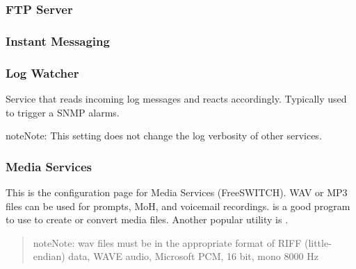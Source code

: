 \documentclass[letterpaper,10pt,english]{sphinxmanual}
\begin{document}
\subsubsection{FTP Server}
\label{\detokenize{webui:ftp-server}}\label{\detokenize{webui:id36}}\begin{quote}

\end{quote}


\subsubsection{Instant Messaging}
\label{\detokenize{webui:id37}}\begin{quote}

\end{quote}


\subsubsection{Log Watcher}
\label{\detokenize{webui:log-watcher}}\label{\detokenize{webui:id38}}
Service that reads incoming log messages and reacts accordingly. Typically used to trigger a SNMP alarms.

\begin{sphinxadmonition}{note}{Note:}
This setting does not change the log verbosity of other services.
\end{sphinxadmonition}



\subsubsection{Media Services}
\label{\detokenize{webui:media-services}}\label{\detokenize{webui:id39}}
This is the configuration page for Media Services (FreeSWITCH). WAV or MP3 files can be used for prompts, MoH, and voicemail recordings.
 is a good program to use to create or convert media files. Another popular utility is .
\begin{quote}

\begin{sphinxadmonition}{note}{Note:}
wav files must be in the appropriate format of RIFF (little-endian) data, WAVE audio, Microsoft PCM, 16 bit, mono 8000 Hz
\end{sphinxadmonition}
\end{quote}
\end{document}
